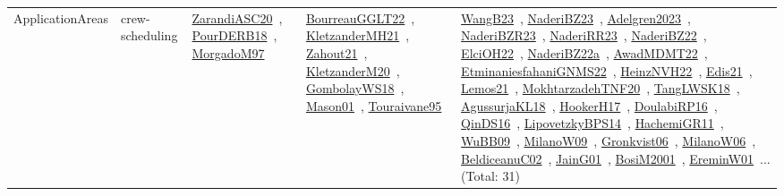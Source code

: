 {\begin{longtable}{lp{3cm}>{\raggedright\arraybackslash}p{6cm}>{\raggedright\arraybackslash}p{6cm}>{\raggedright\arraybackslash}p{8cm}}
\index{crew-scheduling}\index{ApplicationAreas!crew-scheduling}ApplicationAreas & crew-scheduling & \href{../works/ZarandiASC20.pdf}{ZarandiASC20}~\cite{ZarandiASC20}, \href{../works/PourDERB18.pdf}{PourDERB18}~\cite{PourDERB18}, \href{../works/MorgadoM97.pdf}{MorgadoM97}~\cite{MorgadoM97} & \href{../works/BourreauGGLT22.pdf}{BourreauGGLT22}~\cite{BourreauGGLT22}, \href{../works/KletzanderMH21.pdf}{KletzanderMH21}~\cite{KletzanderMH21}, \href{../works/Zahout21.pdf}{Zahout21}~\cite{Zahout21}, \href{../works/KletzanderM20.pdf}{KletzanderM20}~\cite{KletzanderM20}, \href{../works/GombolayWS18.pdf}{GombolayWS18}~\cite{GombolayWS18}, \href{../works/Mason01.pdf}{Mason01}~\cite{Mason01}, \href{../works/Touraivane95.pdf}{Touraivane95}~\cite{Touraivane95} & \href{../works/WangB23.pdf}{WangB23}~\cite{WangB23}, \href{../works/NaderiBZ23.pdf}{NaderiBZ23}~\cite{NaderiBZ23}, \href{../works/Adelgren2023.pdf}{Adelgren2023}~\cite{Adelgren2023}, \href{../works/NaderiBZR23.pdf}{NaderiBZR23}~\cite{NaderiBZR23}, \href{../works/NaderiRR23.pdf}{NaderiRR23}~\cite{NaderiRR23}, \href{../works/NaderiBZ22.pdf}{NaderiBZ22}~\cite{NaderiBZ22}, \href{../works/ElciOH22.pdf}{ElciOH22}~\cite{ElciOH22}, \href{../works/NaderiBZ22a.pdf}{NaderiBZ22a}~\cite{NaderiBZ22a}, \href{../works/AwadMDMT22.pdf}{AwadMDMT22}~\cite{AwadMDMT22}, \href{../works/EtminaniesfahaniGNMS22.pdf}{EtminaniesfahaniGNMS22}~\cite{EtminaniesfahaniGNMS22}, \href{../works/HeinzNVH22.pdf}{HeinzNVH22}~\cite{HeinzNVH22}, \href{../works/Edis21.pdf}{Edis21}~\cite{Edis21}, \href{../works/Lemos21.pdf}{Lemos21}~\cite{Lemos21}, \href{../works/MokhtarzadehTNF20.pdf}{MokhtarzadehTNF20}~\cite{MokhtarzadehTNF20}, \href{../works/TangLWSK18.pdf}{TangLWSK18}~\cite{TangLWSK18}, \href{../works/AgussurjaKL18.pdf}{AgussurjaKL18}~\cite{AgussurjaKL18}, \href{../works/HookerH17.pdf}{HookerH17}~\cite{HookerH17}, \href{../works/DoulabiRP16.pdf}{DoulabiRP16}~\cite{DoulabiRP16}, \href{../works/QinDS16.pdf}{QinDS16}~\cite{QinDS16}, \href{../works/LipovetzkyBPS14.pdf}{LipovetzkyBPS14}~\cite{LipovetzkyBPS14}, \href{../works/HachemiGR11.pdf}{HachemiGR11}~\cite{HachemiGR11}, \href{../works/WuBB09.pdf}{WuBB09}~\cite{WuBB09}, \href{../works/MilanoW09.pdf}{MilanoW09}~\cite{MilanoW09}, \href{../works/Gronkvist06.pdf}{Gronkvist06}~\cite{Gronkvist06}, \href{../works/MilanoW06.pdf}{MilanoW06}~\cite{MilanoW06}, \href{../works/BeldiceanuC02.pdf}{BeldiceanuC02}~\cite{BeldiceanuC02}, \href{../works/JainG01.pdf}{JainG01}~\cite{JainG01}, \href{../works/BosiM2001.pdf}{BosiM2001}~\cite{BosiM2001}, \href{../works/EreminW01.pdf}{EreminW01}~\cite{EreminW01}... (Total: 31)\\

\end{longtable}}
